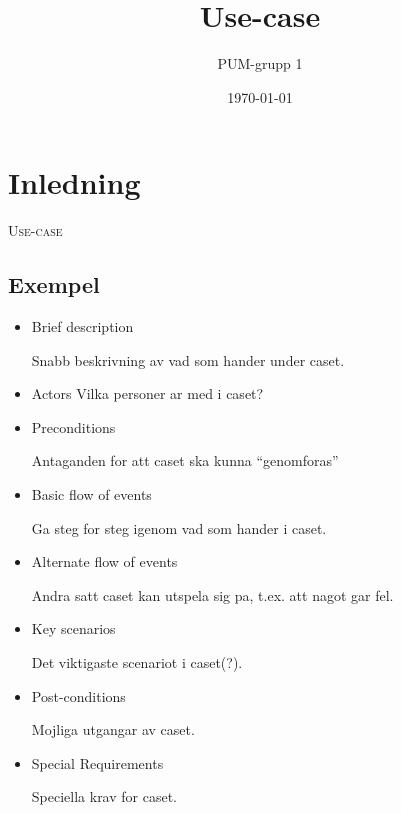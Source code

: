 

\ifpdf
\else
\fi

\title{Use-case}
\author{PUM-grupp 1}
\date{\today}



\maketitle\thispagestyle{empty}

\newpage

\section{Inledning}
\textsc{\LARGE Use-case}

\subsection{Exempel}
\begin{itemize}
	\item Brief description
	
	Snabb beskrivning av vad som hander under caset.
	\item Actors
	Vilka personer ar med i caset?
	
	\item Preconditions
	
	Antaganden for att caset ska kunna "`genomforas"'
	\item Basic flow of events
	
	Ga steg for steg igenom vad som hander i caset.
	\item Alternate flow of events
	
	Andra satt caset kan utspela sig pa, t.ex. att nagot gar fel.
	\item Key scenarios
	
	Det viktigaste scenariot i caset(?).
	\item Post-conditions
	
	Mojliga utgangar av caset.
	\item Special Requirements
	
	Speciella krav for caset.
\end{itemize}

